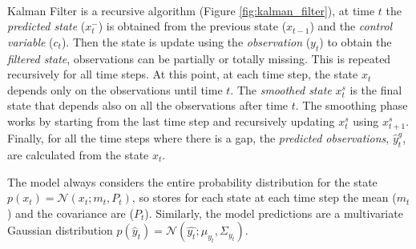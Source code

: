 \documentclass{article}
\newcommand{\norm}[3]{\mathcal{N}\left(#1; #2, #3\right)} %
\begin{document}
\paragraph{} Kalman Filter is a recursive algorithm (Figure \ref{fig:kalman_filter}), at time $t$ the \textit{predicted state} ($x^-_t$) is obtained from the previous state ($x_{t-1}$) and the \textit{control variable} ($c_t$). Then the state is update using the \textit{observation} ($y_t$) to obtain the \textit{filtered state}, observations can be partially or totally missing. This is repeated recursively for all time steps. At this point, at each time step, the state $x_t$ depends only on the observations until time $t$. The \textit{smoothed state} $x^s_t$ is the final state that depends also on all the observations after time $t$. The smoothing phase works by starting from the last time step and recursively updating $x^s_t$ using $x^s_{t+1}$.
Finally, for all the time steps where there is a gap, the \textit{predicted observations}, $\hat{y}^g_t$, are calculated from the state $x_t$.

The model always considers the entire probability distribution for the state $p(x_t) = \norm{x_t}{m_t}{P_t}$, so stores for each state at each time step the mean ($m_t$) and the covariance are ($P_t$). Similarly, the model predictions are a multivariate Gaussian distribution $p(\hat{y}_t) =  \norm{\hat{y_t}}{\mu_{y_t}}{\Sigma_{y_t}}$.
\end{document}
